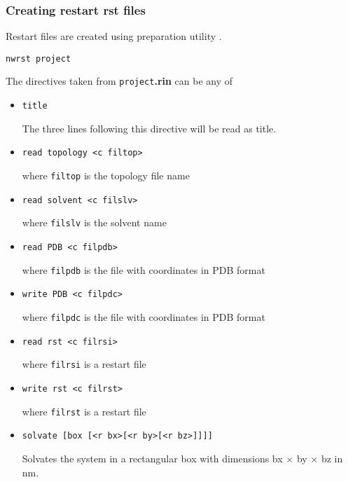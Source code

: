 \subsubsection{Creating restart {\bf rst} files}
\label{nwrst}
Restart files are created using preparation utility \nwrst.
\begin{verbatim}
nwrst project
\end{verbatim}
The directives taken from {\tt project}{\bf.rin} can be any of
\begin{itemize}

\item
\begin{verbatim}
title
\end{verbatim}
The three lines following this directive will be read as title.

\item
\begin{verbatim}
read topology <c filtop>
\end{verbatim}
where {\tt filtop} is the topology file name

\item
\begin{verbatim}
read solvent <c filslv>
\end{verbatim}
where {\tt filslv} is the solvent name

\item
\begin{verbatim}
read PDB <c filpdb>
\end{verbatim}
where {\tt filpdb} is the file with coordinates in PDB format

\item
\begin{verbatim}
write PDB <c filpdc>
\end{verbatim}
where {\tt filpdc} is the file with coordinates in PDB format

\item
\begin{verbatim}
read rst <c filrsi>
\end{verbatim}
where {\tt filrsi} is a restart file

\item
\begin{verbatim}
write rst <c filrst>
\end{verbatim}
where {\tt filrst} is a restart file

\item
\begin{verbatim}
solvate [box [<r bx>[<r by>[<r bz>]]]]
\end{verbatim}
Solvates the system in a rectangular box with dimensions 
bx $\times$ by $\times$ bz in nm.


\end{itemize}
